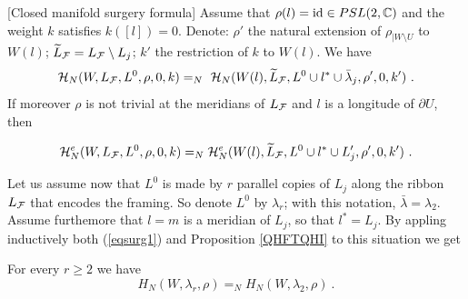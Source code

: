 \begin{teo} \label{surcomp} {\rm
[Closed manifold surgery formula]} Assume that $\rho(l)={\rm id} \in
  PSL(2,\mathbb{C})$ and the weight $k$ satisfies $k([l])=0$. Denote: $\rho'$
  the natural extension of $\rho_{|W \setminus U}$ to $W(l)$;
  $\widetilde L_{\mathcal F} = L_{\mathcal F} \setminus L_j$; $k'$ the restriction of
  $k$ to $W(l)$. We have
\begin{equation}\label{eqsurg1}
{\mathcal H}_N(W,L_{\mathcal F},L^0,\rho,0,k) =_N \ {\mathcal H}_N(W(l),\widetilde L_{\mathcal F}, L^0\cup l^* \cup
\bar{\lambda}_j,\rho',0,k') \ .
\end{equation}
If moreover $\rho$ is not trivial at the meridians of $L_{\mathcal F}$ and $l$
is a longitude of $\partial U$, then

\begin{equation}\label{eqsurg2}
{\mathcal H}_N^e(W,L_{\mathcal F},L^0,\rho,0,k) =_N {\mathcal H}_N^e(W(l),\widetilde L_{\mathcal F}, L^0\cup l^*
\cup L'_j,\rho',0,k') \ .
\end{equation}
\end{teo}
Let us assume now that $L^0$ is made by $r$ parallel copies of $L_j$
along the ribbon $L_{\mathcal F}$ that encodes the framing. So denote $L^0$ by
$\lambda_r$; with this notation, $\bar \lambda = \lambda_2$. Assume furthemore
that $l=m$ is a meridian of $L_j$, so that $l^*=L_j$. By appling inductively
both (\ref{eqsurg1}) and Proposition \ref{QHFTQHI} to this situation we get
\begin{cor} For every $r\geq 2$ we have
$$H_N(W,\lambda_r,\rho)=_N H_N(W,\lambda_2,\rho) \ . $$
\end{cor}


